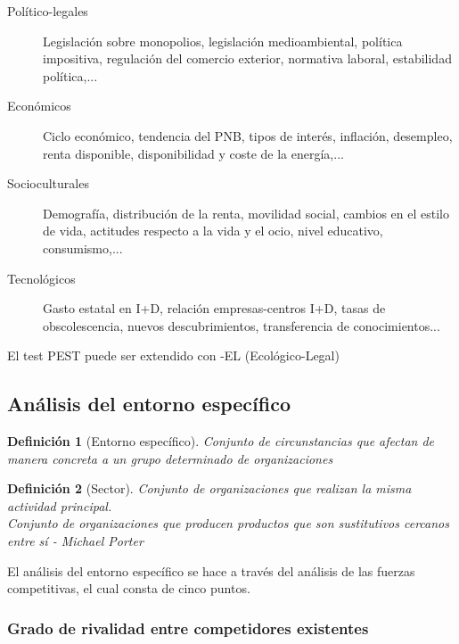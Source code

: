 \documentclass[12pt]{article}
\theoremstyle{definition_wo_parentheses}
\newtheorem{definicion}{Definición}[section]
\begin{document}
\begin{description}
\item[Político-legales] Legislación sobre monopolios, legislación medioambiental, política impositiva, regulación del comercio exterior, normativa laboral, estabilidad política,...
\item[Económicos] Ciclo económico, tendencia del PNB, tipos de interés, inflación, desempleo, renta disponible, disponibilidad y coste de la energía,...
\item[Socioculturales] Demografía, distribución de la renta, movilidad social, cambios en el estilo de vida, actitudes respecto a la vida y el ocio, nivel educativo, consumismo,...
\item[Tecnológicos] Gasto estatal en I+D, relación empresas-centros I+D, tasas de obscolescencia, nuevos descubrimientos, transferencia de conocimientos...
\end{description}

El test PEST puede ser extendido con -EL (Ecológico-Legal)

\subsection{Análisis del entorno específico}

\begin{definicion}[Entorno específico]
	Conjunto de circunstancias que afectan de manera concreta a un grupo determinado de organizaciones
\end{definicion}

\begin{definicion}[Sector]
	Conjunto de organizaciones que realizan la misma actividad principal.\\
	Conjunto de organizaciones que producen productos que son sustitutivos cercanos entre sí - \textit{Michael Porter}
\end{definicion}

El análisis del entorno específico se hace a través del análisis de las fuerzas competitivas, el cual consta de cinco puntos.

\subsubsection{Grado de rivalidad entre competidores existentes}
\end{document}

